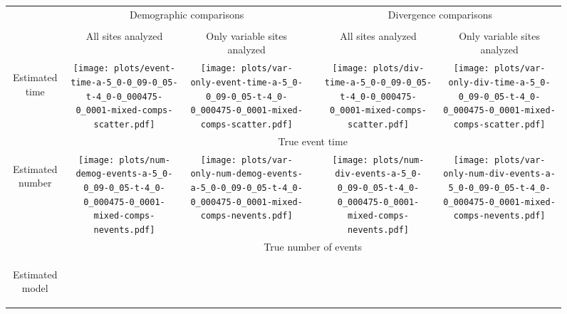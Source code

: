 \documentclass[border=10pt,varwidth=30cm]{standalone}
\begin{document}
\begin{figure}
    \centering
    \begin{tabular}{@{}cccccc@{}}
        & \multicolumn{2}{c}{\LARGE Demographic comparisons}
        &
        & \multicolumn{2}{c}{\LARGE Divergence comparisons} \\[1ex]
        \cline{2-3}\cline{5-6}
        & & & & & \\
        & \multirow{1}{0.15\textwidth}{\Large\centering All sites analyzed}
        & \multirow{1}{0.15\textwidth}{\Large\centering Only variable sites analyzed}
        &
        & \multirow{1}{0.15\textwidth}{\Large\centering All sites analyzed}
        & \multirow{1}{0.15\textwidth}{\Large\centering Only variable sites analyzed} \\[5ex]
        \multirow{1}{*}[8em]{\begin{sideways}\large Estimated time\end{sideways}}
        & \texttt{[image: plots/event-time-a-5\_0-0\_09-0\_05-t-4\_0-0\_000475-0\_0001-mixed-comps-scatter.pdf]}
        & \texttt{[image: plots/var-only-event-time-a-5\_0-0\_09-0\_05-t-4\_0-0\_000475-0\_0001-mixed-comps-scatter.pdf]}
        &
        & \texttt{[image: plots/div-time-a-5\_0-0\_09-0\_05-t-4\_0-0\_000475-0\_0001-mixed-comps-scatter.pdf]}
        & \texttt{[image: plots/var-only-div-time-a-5\_0-0\_09-0\_05-t-4\_0-0\_000475-0\_0001-mixed-comps-scatter.pdf]} \\
        & \multicolumn{5}{c}{\large True event time} \\
        \multirow{1}{*}[9em]{\begin{sideways}\large Estimated number\end{sideways}}
        & \texttt{[image: plots/num-demog-events-a-5\_0-0\_09-0\_05-t-4\_0-0\_000475-0\_0001-mixed-comps-nevents.pdf]}
        & \texttt{[image: plots/var-only-num-demog-events-a-5\_0-0\_09-0\_05-t-4\_0-0\_000475-0\_0001-mixed-comps-nevents.pdf]}
        &
        & \texttt{[image: plots/num-div-events-a-5\_0-0\_09-0\_05-t-4\_0-0\_000475-0\_0001-mixed-comps-nevents.pdf]}
        & \texttt{[image: plots/var-only-num-div-events-a-5\_0-0\_09-0\_05-t-4\_0-0\_000475-0\_0001-mixed-comps-nevents.pdf]} \\
        & \multicolumn{5}{c}{\large True number of events} \\
        \multirow{1}{*}[8.5em]{\begin{sideways}\large Estimated model\end{sideways}}

\end{tabular}
\end{figure}
\end{document}
